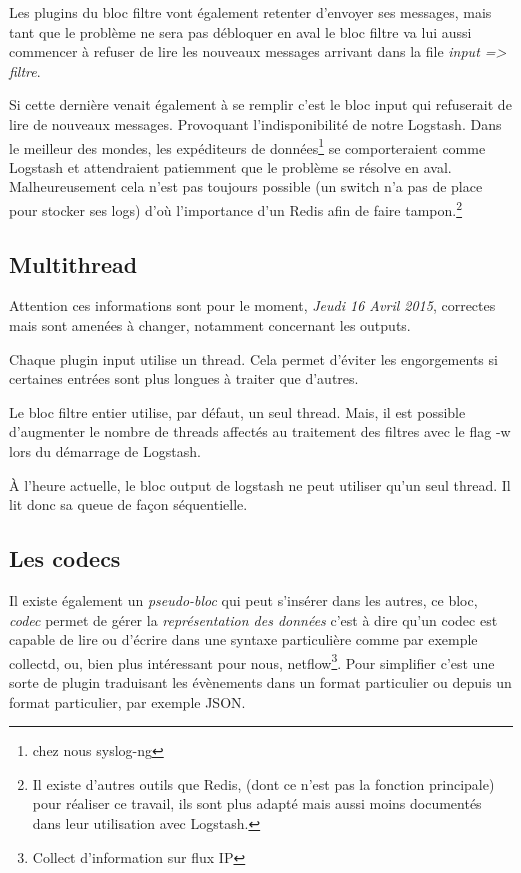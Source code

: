 Les plugins du bloc filtre vont également retenter d'envoyer ses messages, mais tant
que le problème ne sera pas débloquer en aval le bloc filtre va lui aussi commencer
à refuser de lire les nouveaux messages arrivant dans la file \textit{input => filtre}.

Si cette dernière venait également à se remplir c'est le bloc input qui refuserait
de lire de nouveaux messages. Provoquant l'indisponibilité de notre Logstash.
Dans le meilleur des mondes, les expéditeurs de données\footnote{chez nous syslog-ng} 
se comporteraient comme Logstash et attendraient patiemment que le problème se résolve 
en aval. Malheureusement cela n'est pas toujours possible (un switch n'a pas de place 
pour stocker ses logs) d'où l'importance d'un Redis afin de faire tampon.\footnote{Il 
existe d'autres outils que Redis, (dont ce n'est pas la fonction
principale) pour réaliser ce travail, ils sont plus adapté mais aussi moins documentés
dans leur utilisation avec Logstash.}

\subsection{Multithread}
\label{subsec:logstashmultithread}
{\footnotesize Attention ces informations sont pour le moment, \textit{Jeudi 16 Avril 2015}, correctes 
mais sont amenées à changer, notamment concernant les outputs.}

Chaque plugin input utilise un thread. Cela permet d'éviter les engorgements si  
certaines entrées sont plus longues à traiter que d'autres.

Le bloc filtre entier utilise, par défaut, un seul thread. Mais, il est possible 
d'augmenter le nombre de threads affectés au traitement des filtres avec le \gls{flag}
-w lors du démarrage de Logstash.

À l'heure actuelle, le bloc output de logstash ne peut utiliser qu'un seul thread.
Il lit donc sa queue de façon séquentielle. 
\subsection{Les codecs}
\label{subsec:logstashcodec}
Il existe également un \textit{pseudo-bloc} qui peut s'insérer dans les autres, ce 
bloc, \emph{codec} permet de gérer la \textit{représentation des données} c'est 
à dire qu'un codec est capable de lire ou d'écrire dans une syntaxe particulière 
comme par exemple collectd, ou, bien plus intéressant pour nous, netflow\footnote{Collect d'information sur flux IP }. Pour simplifier c'est une sorte de plugin traduisant les évènements dans un format particulier ou depuis un format particulier, par exemple JSON.

